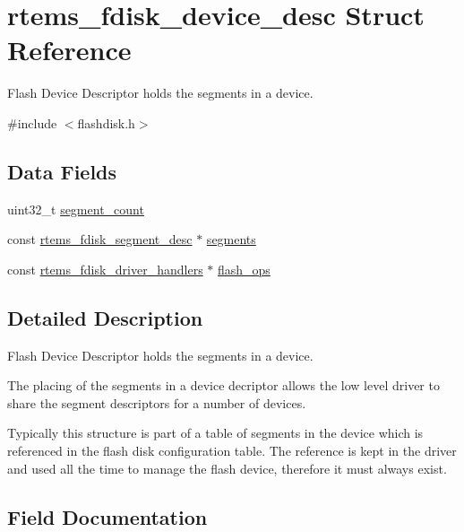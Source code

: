 \hypertarget{structrtems__fdisk__device__desc}{}\section{rtems\+\_\+fdisk\+\_\+device\+\_\+desc Struct Reference}
\label{structrtems__fdisk__device__desc}


Flash Device Descriptor holds the segments in a device.  




{\ttfamily \#include $<$flashdisk.\+h$>$}

\subsection*{Data Fields}
\begin{DoxyCompactItemize}
\item 
uint32\+\_\+t \mbox{\hyperlink{structrtems__fdisk__device__desc_a506d1a44cd7009b8256e12fcc02e2306}{segment\+\_\+count}}
\item 
const \mbox{\hyperlink{structrtems__fdisk__segment__desc}{rtems\+\_\+fdisk\+\_\+segment\+\_\+desc}} $\ast$ \mbox{\hyperlink{structrtems__fdisk__device__desc_a34e346516450cb073e0cddadcbbfdd8a}{segments}}
\item 
const \mbox{\hyperlink{structrtems__fdisk__driver__handlers}{rtems\+\_\+fdisk\+\_\+driver\+\_\+handlers}} $\ast$ \mbox{\hyperlink{structrtems__fdisk__device__desc_a03a0061eaead224dc4f929f34851735e}{flash\+\_\+ops}}
\end{DoxyCompactItemize}


\subsection{Detailed Description}
Flash Device Descriptor holds the segments in a device. 

The placing of the segments in a device decriptor allows the low level driver to share the segment descriptors for a number of devices.

Typically this structure is part of a table of segments in the device which is referenced in the flash disk configuration table. The reference is kept in the driver and used all the time to manage the flash device, therefore it must always exist. 

\subsection{Field Documentation}
\mbox{\label{structrtems__fdisk__device__desc_a03a0061eaead224dc4f929f34851735e}} 
